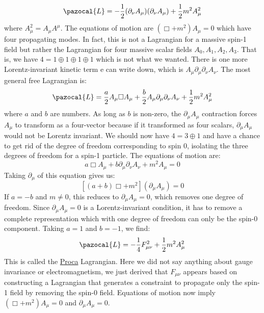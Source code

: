 \documentclass[../main.tex]{subfiles}
\begin{document}
\[
\pazocal{L}=-\frac{1}{2}(\partial_\nu A_\mu)(\partial_\nu A_\mu)+\frac{1}{2}m^2A_\mu^2
\]
where $A_\mu^2=A_\mu A^\mu$. The equations of motion are $(\Box+m^2)A_\mu=0$ which have four propagating modes. In fact, this is not a Lagrangian for a massive spin-1 field but rather the Lagrangian for four massive scalar fields $A_0, A_1, A_2, A_3$. That is, we have $4=1\oplus1\oplus1\oplus1$ which is not what we wanted. There is one more Lorentz-invariant kinetic term e can write down, which is $A_\mu\partial_\mu\partial_\nu A_\nu$. The most general free Lagrangian is:
\[
\pazocal{L}=\frac{a}{2}A_\mu\Box A_\mu+\frac{b}{2}A_\mu\partial_\mu\partial_\nu A_\nu+\frac{1}{2}m^2A_\mu^2
\]
where $a$ and $b$ are numbers. As long as $b$ is non-zero, the $\partial_\mu A_\mu$ contraction forces $A_\mu$ to transform as a four-vector because if it transformed as four scalars, $\partial_\mu A_\mu$ would not be Lorentz invariant. We should now have $4=3\oplus1$ and have a chance to get rid of the degree of freedom corresponding to spin 0, isolating the three degrees of freedom for a spin-1 particle. The equations of motion are:
\[
a\Box A_\mu+b\partial_\mu\partial_\nu A_\nu+m^2A_\mu=0
\]
Taking $\partial_\mu$ of this equation gives us:
\[
[(a+b)\Box+m^2](\partial_\mu A_\mu)=0
\]
If $a=-b$ and $m\neq0$, this reduces to $\partial_\mu A_\mu=0$, which removes one degree of freedom. Since $\partial_\mu A_\mu=0$ is a Lorentz-invariant condition, it has to remove a complete representation which with one degree of freedom can only be the spin-0 component. Taking $a=1$ and $b=-1$, we find:
\[
\pazocal{L}=-\frac{1}{4}F_{\mu\nu}^2+\frac{1}{2}m^2A_\mu^2
\]
This is called the \href{https://en.wikipedia.org/wiki/Alexandru_Proca}{Proca} Lagrangian. Here we did not say anything about gauge invariance or electromagnetism, we just derived that $F_{\mu\nu}$ appears based on constructing a Lagrangian that generates a constraint to propagate only the spin-1 field by removing the spin-0 field. Equations of motion now imply $(\Box+m^2)A_\mu=0$ and $\partial_\mu A_\mu=0$.
\end{document}
